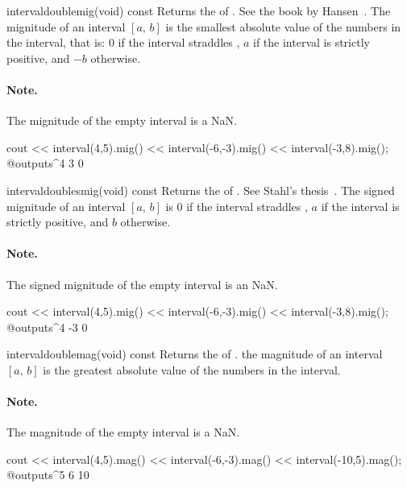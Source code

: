 \documentclass{manual}
\newcommand{\itv}[2]{\ensuremath{[#1,\,#2]}}
\begin{document}
\begin{defmethod}{interval}{double}{mig}{(void) const}
  Returns the  of . See the book by
  Hansen~. The mignitude of an
  interval \itv{a}{b} is the smallest absolute value of the numbers in
  the interval, that is: $0$ if the interval straddles , $a$
  if the interval is strictly positive, and $-b$ otherwise.

\paragraph{Note.} The mignitude of the empty interval is a NaN.
\begin{example}
cout << interval(4,5).mig()
     << interval(-6,-3).mig()
     << interval(-3,8).mig();
@outputs^4 3 0~
\end{example}
\end{defmethod}

\begin{defmethod}{interval}{double}{smig}{(void) const}
  Returns the  of .  See Stahl's
  thesis~. The signed mignitude of
  an interval \itv{a}{b} is $0$ if the interval straddles ,
  $a$ if the interval is strictly positive, and $b$ otherwise.

\paragraph{Note.} The signed mignitude of the empty interval is an NaN.
\begin{example}
cout << interval(4,5).mig()
     << interval(-6,-3).mig()
     << interval(-3,8).mig();
@outputs^4 -3 0~
\end{example}
\end{defmethod}

\begin{defmethod}{interval}{double}{mag}{(void) const}
  Returns the  of . the magnitude of an
  interval \itv{a}{b} is the greatest absolute value of the numbers in
  the interval.

\paragraph{Note.} The magnitude of the empty interval is a NaN.
\begin{example}
cout << interval(4,5).mag()
     << interval(-6,-3).mag()
     << interval(-10,5).mag();
@outputs^5 6 10~
\end{example}
\end{defmethod}
\end{document}
